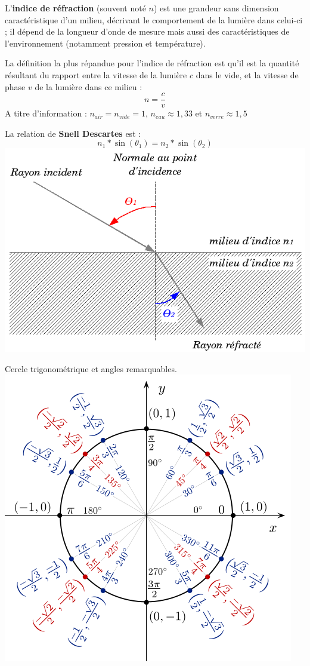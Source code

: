 \documentclass[a4paper,11pt]{article}
\begin{document}
\begin{form}
L'\textbf{indice de réfraction} (souvent noté $n$) est une grandeur sans dimension caractéristique d'un milieu, décrivant le comportement de la lumière dans celui-ci ; il dépend de la longueur d'onde de mesure mais aussi des caractéristiques de l'environnement (notamment pression et température). 

La définition la plus répandue pour l'indice de réfraction est qu'il est la quantité résultant du rapport entre la vitesse de la lumière $c$ dans le vide, et la vitesse de phase $v$ de la lumière dans ce milieu : $$n=\frac{c}{v}$$
A titre d'information : $n_{air}=n_{vide}=1$, $n_{eau} \approx 1,33$ et $n_{verre} \approx 1,5$
\end{form}
\begin{form}
  La relation de \textbf{Snell Descartes} est :
  $$n_{1}*\sin(\theta_{1})=n_{2}*\sin(\theta_{2})$$
\includegraphics[scale=0.5]{Refraction_fr.png} \centering
\end{form}
\begin{defi}
Cercle trigonométrique et angles remarquables.
\\\centering \includegraphics[scale=0.5]{trigo.png}
\end{defi}
\end{document}
